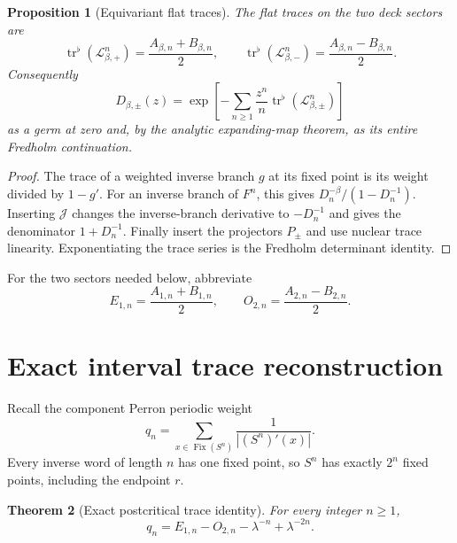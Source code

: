 \documentclass[11pt]{article}
\newtheorem{theorem}{Theorem}[section]
\newtheorem{proposition}[theorem]{Proposition}
\theoremstyle{definition}
\theoremstyle{remark}
\newcommand{\Fix}{\operatorname{Fix}}
\newcommand{\trflat}{\operatorname{tr}^{\flat}}
\newcommand{\cL}{\mathcal L}
\newcommand{\iotaop}{\mathcal J}
\begin{document}
\begin{proposition}[Equivariant flat traces]
\label{prop:equivariant-traces}
The flat traces on the two deck sectors are
\begin{equation}\label{eq:sector-traces}
 \trflat(\cL_{\beta,+}^n)
 =\frac{A_{\beta,n}+B_{\beta,n}}2,
 \qquad
 \trflat(\cL_{\beta,-}^n)
 =\frac{A_{\beta,n}-B_{\beta,n}}2.
\end{equation}
Consequently
\begin{equation}\label{eq:determinant-traces}
 D_{\beta,\pm}(z)
 =\exp\left[-\sum_{n\ge1}
 \frac{z^n}{n}\trflat(\cL_{\beta,\pm}^n)\right]
\end{equation}
as a germ at zero and, by the analytic expanding-map theorem, as its entire
Fredholm continuation.
\end{proposition}

\begin{proof}
The trace of a weighted inverse branch $g$ at its fixed point is its weight
divided by $1-g'$.  For an inverse branch of $F^n$, this gives
$D_n^{-\beta}/(1-D_n^{-1})$.  Inserting $\iotaop$ changes the inverse-branch
derivative to $-D_n^{-1}$ and gives the denominator $1+D_n^{-1}$.  Finally
insert the projectors $P_\pm$ and use nuclear trace linearity.  Exponentiating
the trace series is the Fredholm determinant identity.
\end{proof}

For the two sectors needed below, abbreviate
\begin{equation}\label{eq:E-O}
 E_{1,n}=\frac{A_{1,n}+B_{1,n}}2,
 \qquad
 O_{2,n}=\frac{A_{2,n}-B_{2,n}}2.
\end{equation}

\section{Exact interval trace reconstruction}
\label{sec:trace-identity}

Recall the component Perron periodic weight
\begin{equation}\label{eq:q-definition}
 q_n=\sum_{x\in\Fix(S^n)}\frac1{|(S^n)'(x)|}.
\end{equation}
Every inverse word of length $n$ has one fixed point, so $S^n$ has exactly
$2^n$ fixed points, including the endpoint $r$.

\begin{theorem}[Exact postcritical trace identity]
\label{thm:trace-identity}
For every integer $n\ge1$,
\begin{equation}\label{eq:main-trace-identity}
 \boxed{
 q_n=E_{1,n}-O_{2,n}-\lambda^{-n}+\lambda^{-2n}.}
\end{equation}
\end{theorem}
\end{document}
